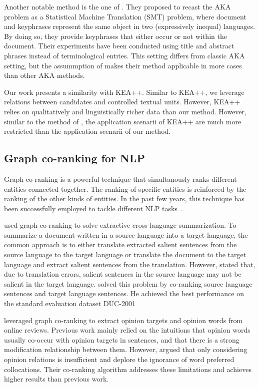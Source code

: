     Another notable method is the one of . They
    proposed to recast the AKA problem as a Statistical Machine Translation
    (SMT) problem, where document and keyphrases represent the same object in
    two (expressively inequal) languages. By doing so, they provide keyphrases
    that either occur or not within the document. Their experiments have
    been conducted using title and abstract phrases instead of terminological
    entries. This setting differs from classic AKA setting, but the assummption
    of  makes their method applicable in more
    cases than other AKA methods.

    Our work presents a similarity with KEA++. Similar to KEA++, we leverage
    relations between candidates and controlled textual units. However, KEA++
    relies on qualitatively and linguistically richer data than our method.
    However, similar to the method of , the
    application scenarii of KEA++ are much more restricted than the application
    scenarii of our method.

  \subsection{Graph co-ranking for NLP}
  \label{subsec:graph_co_ranking_for_nlp}
    Graph co-ranking is a powerful technique that simultanously ranks different
    entities connected together. The ranking of specific entities is reinforced
    by the ranking of the other kinds of entities. In the past few years, this
    technique has been successfully employed to tackle different NLP
    tasks~\cite{wan2011corankingsummarization,liu2014corankingopinionmining}.

     used graph co-ranking to solve
    extractive cross-language summarization. To summarize a document written in
    a source language into a target language, the common approach is to either
    translate extracted salient sentences from the source language to the target
    language or translate the document to the target language and extract
    salient sentences from the translation. However,
     stated that, due to translation
    errors, salient sentences in the source language may not be salient in the
    target language.  solved this problem
    by co-ranking source language sentences and target language sentences. He
    achieved the best performance on the standard evaluation dataset
    DUC-2001~\cite{over2001duc}

     leveraged graph co-ranking to
    extract opinion targets and opinion words from online reviews. Previous work
    mainly relied on the intuitions that opinion words usually co-occur with
    opinion targets in sentences, and that there is a strong modification
    relationship between them. However, 
    argued that only considering opinion relations is insufficient and deplore
    the ignorance of word preferred collocations. Their co-ranking algorithm
    addresses these limitations and achieves higher results than previous work.

